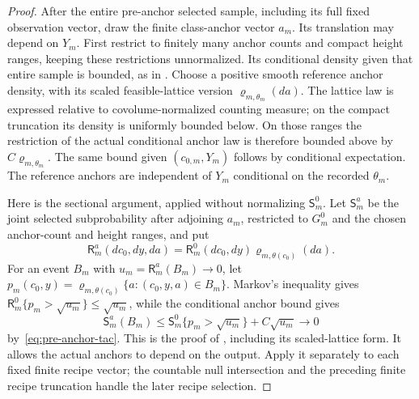 \begin{proof}
After the entire pre-anchor selected sample, including its full
fixed observation vector, draw the finite class-anchor vector
\(a_m\).  Its translation may depend on \(Y_m\).  First restrict
to finitely many anchor counts and compact height ranges, keeping
these restrictions unnormalized.  Its conditional density given
that entire sample is bounded, as in \cite[Lemma~11.25]{P}.
Choose a positive smooth reference anchor density, with its scaled
feasible-lattice version \(\varrho_{m,\theta_m}(da)\).  The lattice
law is expressed relative to covolume-normalized counting measure;
on the compact truncation its density is uniformly bounded below.
On those ranges the restriction of the actual conditional anchor
law is therefore bounded above by \(C\varrho_{m,\theta_m}\).
The same bound given \((c_{0,m},Y_m)\) follows by conditional
expectation.  The reference anchors are independent
of \(Y_m\) conditional on the recorded \(\theta_m\).

Here is the sectional argument, applied without normalizing
\(\mathsf S_m^0\).  Let \(\mathsf S_m^a\) be the joint selected
subprobability after adjoining \(a_m\), restricted to \(G_m^0\)
and the chosen anchor-count and height ranges,
and put
\[
 \mathsf R_m^a(dc_0,dy,da)
   =\mathsf R_m^0(dc_0,dy)\varrho_{m,\theta(c_0)}(da).
\]
For an event \(B_m\) with \(u_m=\mathsf R_m^a(B_m)\to0\), let
\(p_m(c_0,y)=\varrho_{m,\theta(c_0)}
 \{a:(c_0,y,a)\in B_m\}\).
Markov's inequality gives
\(\mathsf R_m^0\{p_m>\sqrt{u_m}\}\le\sqrt{u_m}\), while the
conditional anchor bound gives
\[
 \mathsf S_m^a(B_m)
 \le \mathsf S_m^0\{p_m>\sqrt{u_m}\}+C\sqrt{u_m}
 \longrightarrow0
\]
by~\eqref{eq:pre-anchor-tac}.  This is the proof of
\cite[Lemma~11.25]{P}, including its scaled-lattice form.
It allows the actual anchors to depend on the output.  Apply it
separately to each fixed finite recipe vector; the countable null
intersection and the preceding finite recipe truncation handle
the later recipe selection.


\end{proof}

